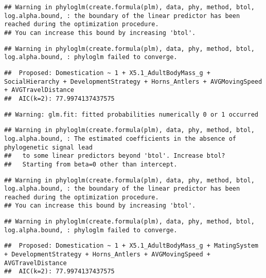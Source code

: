 \documentclass[
]{article}
\begin{document}
\begin{verbatim}
## Warning in phyloglm(create.formula(plm), data, phy, method, btol, log.alpha.bound, : the boundary of the linear predictor has been reached during the optimization procedure.
## You can increase this bound by increasing 'btol'.
\end{verbatim}

\begin{verbatim}
## Warning in phyloglm(create.formula(plm), data, phy, method, btol, log.alpha.bound, : phyloglm failed to converge.
\end{verbatim}

\begin{verbatim}
##  Proposed: Domestication ~ 1 + X5.1_AdultBodyMass_g + SocialHierarchy + DevelopmentStrategy + Horns_Antlers + AVGMovingSpeed + AVGTravelDistance
##  AIC(k=2): 77.9974137437575
\end{verbatim}

\begin{verbatim}
## Warning: glm.fit: fitted probabilities numerically 0 or 1 occurred
\end{verbatim}

\begin{verbatim}
## Warning in phyloglm(create.formula(plm), data, phy, method, btol, log.alpha.bound, : The estimated coefficients in the absence of phylogenetic signal lead
##   to some linear predictors beyond 'btol'. Increase btol?
##   Starting from beta=0 other than intercept.
\end{verbatim}

\begin{verbatim}
## Warning in phyloglm(create.formula(plm), data, phy, method, btol, log.alpha.bound, : the boundary of the linear predictor has been reached during the optimization procedure.
## You can increase this bound by increasing 'btol'.
\end{verbatim}

\begin{verbatim}
## Warning in phyloglm(create.formula(plm), data, phy, method, btol, log.alpha.bound, : phyloglm failed to converge.
\end{verbatim}

\begin{verbatim}
##  Proposed: Domestication ~ 1 + X5.1_AdultBodyMass_g + MatingSystem + DevelopmentStrategy + Horns_Antlers + AVGMovingSpeed + AVGTravelDistance
##  AIC(k=2): 77.9974137437575
\end{verbatim}
\end{document}
